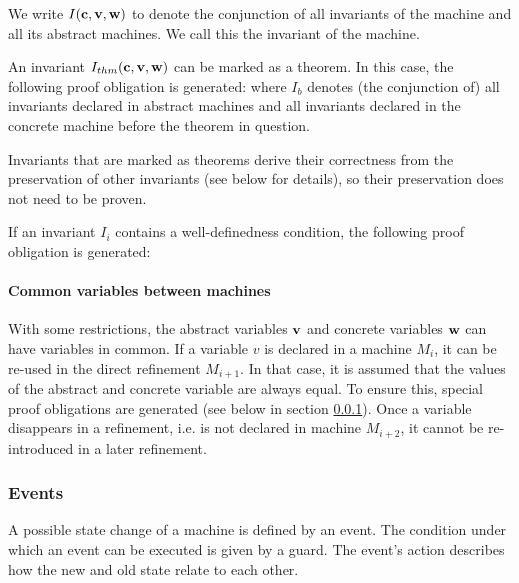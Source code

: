 We write $I(\mathbf{c},\mathbf{v},\mathbf{w})$ to denote the conjunction of all invariants
of the machine and all its abstract machines. We call this the invariant of the machine.

An invariant $I_{thm}(\mathbf{c},\mathbf{v},\mathbf{w})$ can be marked as a theorem. In this case, the following proof obligation is generated:
where $I_b$ denotes (the conjunction of) all invariants declared in abstract machines and all invariants declared in the concrete machine before
the theorem in question.

Invariants that are marked as theorems derive their correctness from the preservation of other invariants (see below for details), so their preservation does not need to be proven.

If an invariant $I_i$ contains a well-definedness condition, the following proof obligation is generated:

\paragraph{Common variables between machines}
With some restrictions, the abstract variables $\mathbf{v}$ and concrete
  variables $\mathbf{w}$ can have variables in common.
If a variable $v$ is declared in a machine $M_i$, it can be re-used in the
  direct refinement $M_{i+1}$. 
In that case, it is assumed that the values of the abstract and concrete variable 
  are always equal.
To ensure this, special proof obligations are generated (see below in section \ref{events}).
Once a variable disappears in a refinement, i.e. is not declared in machine $M_{i+2}$,
  it cannot be re-introduced in a later refinement.

\subsubsection{Events}
\label{events}
A possible state change of a machine is defined by an event.
The condition under which an event can be executed is given by a guard. The event's action
describes how the new and old state relate to each other.

